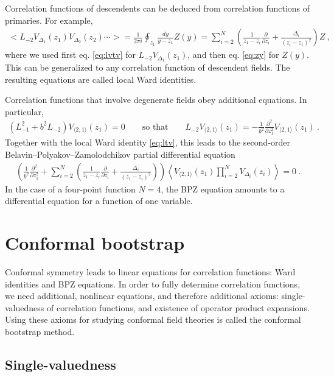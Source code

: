 \documentclass[12pt, a4paper]{article}
\theoremstyle{break}
\begin{document}
Correlation functions of descendents can be deduced from correlation functions of primaries. For example,
\begin{align}
 \Big< L_{-2}V_{\Delta_1}(z_1) V_{\Delta_2}(z_2)\cdots \Big>
  = \frac{1}{2\pi i}\oint_{z_1} \frac{dy}{y-z_1} Z(y)
  =\sum_{i=2}^N\left(\frac{1}{z_1-z_i}\frac{\partial}{\partial z_i} +\frac{\Delta_i}{(z_i-z_1)^2}\right) Z\ ,
  \label{eq:ltv}
\end{align}
where we used first eq. \eqref{eq:lvtv} for $L_{-2}V_{\Delta_1}(z_1)$, and then eq. \eqref{eq:zy} for $Z(y)$.
This can be generalized to any correlation function of descendent fields. The resulting equations are called local Ward identities.

Correlation functions that involve degenerate fields obey additional equations. In particular, 
\begin{align}
\left(L_{-1}^2 + b^2 L_{-2}\right) V_{\langle 2, 1 \rangle}(z_1)  = 0\qquad \text{so that} \qquad L_{-2}V_{\langle 2, 1 \rangle}(z_1) = -\frac{1}{b^2}\frac{\partial^2}{\partial z_1^2} V_{\langle 2, 1 \rangle}(z_1)\ .
\end{align}
Together with the local Ward identity \eqref{eq:ltv},
this leads to the second-order Belavin--Polyakov--Zamolodchikov partial differential equation
\begin{align}
 \left( \frac{1}{b^2}\frac{\partial^2}{\partial z_1^2} + \sum_{i=2}^N\left(\frac{1}{z_1-z_i}\frac{\partial}{\partial z_i} +\frac{\Delta_i}{(z_1-z_i)^2}\right) \right)\left< V_{\langle 2, 1 \rangle}(z_1) \prod_{i=2}^N V_{\Delta_i}(z_i) \right>  = 0\ .
 \label{eq:bpz}
\end{align}
In the case of a four-point function $N=4$, the BPZ equation amounts to a differential equation for a function of one variable.

\section{Conformal bootstrap}

Conformal symmetry leads to linear equations for correlation functions: Ward identities and BPZ equations. 
In order to fully determine correlation functions, we need additional, nonlinear equations, and therefore additional axioms: single-valuedness of correlation functions, and existence of operator product expansions. 
Using these axioms for studying conformal field theories is called the conformal bootstrap method. 

\subsection{Single-valuedness}
\end{document}
